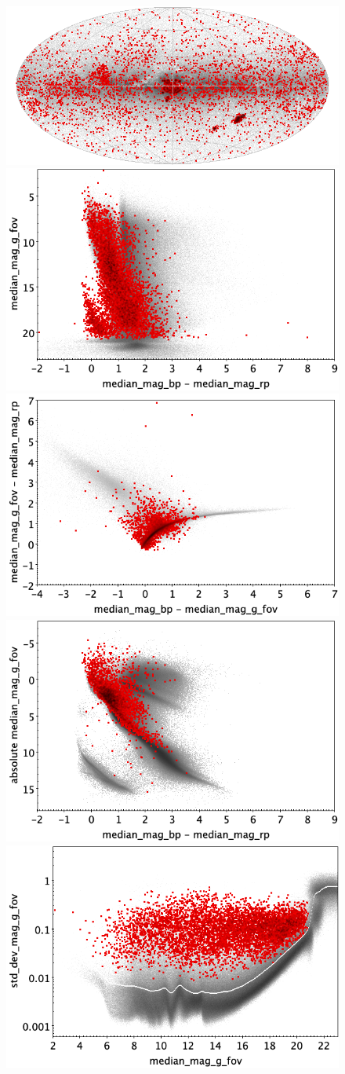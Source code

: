 \documentclass[longauth]{aa}
\begin{document}
\begin{appendix}
\begin{figure}
\centering
{} \includegraphics[width=0.6\hsize]{figures/appendix/ECL_trn_sky.png} \\ %
\vspace{4mm}
 \includegraphics[width=0.45\hsize]{figures/appendix/ECL_trn_cm.png}  %
\hspace{2mm}
 \includegraphics[width=0.45\hsize]{figures/appendix/ECL_trn_cc.png} \\ %
\vspace{4mm}
 \includegraphics[width=0.45\hsize]{figures/appendix/ECL_trn_cam.png}  %
\hspace{2mm}
 \includegraphics[width=0.45\hsize]{figures/appendix/ECL_trn_msd.png} \\ %

\end{figure}
\end{appendix}
\end{document}
